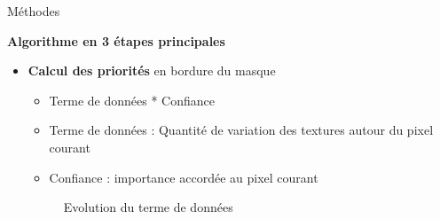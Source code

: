 \documentclass[final,hyperref={pdfpagelabels=false}]{beamer}
\begin{document}
\begin{frame}[t]
\begin{columns}[t]
\begin{column}{.02\textwidth} \end{column}
\end{columns}

\begin{columns}[t]

\begin{column}{.02\textwidth} \end{column}

\begin{column}{.465\textwidth} 


\begin{block}{\Large Méthodes}
 
\textbf{Algorithme en 3 étapes principales}
\begin{itemize}
\item \textbf{Calcul des priorités} en bordure du masque
\begin{itemize}
\item Terme de données * Confiance
\item Terme de données : Quantité de variation des textures autour du pixel courant
\item Confiance : importance accordée au pixel courant
\end{itemize}

\begin{figure}[H]
\centering
{}
\caption{Evolution du terme de données}
\end{figure}


\end{itemize}
\end{block}
\end{column}
\end{columns}
\end{frame}
\end{document}
